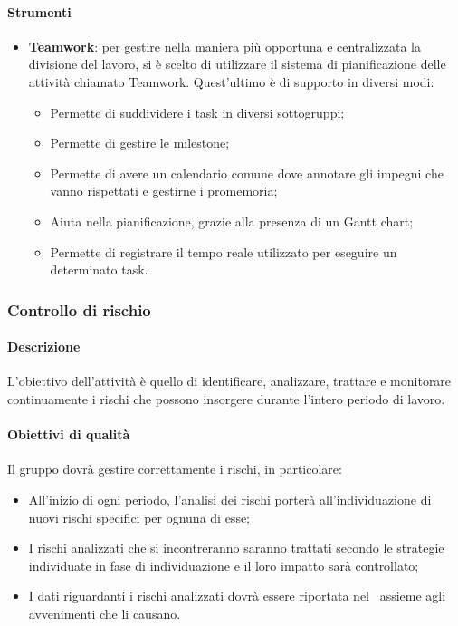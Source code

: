 \documentclass[../NormeDiProgetto_v4.0.0.tex]{subfiles}
\begin{document}
			\paragraph{Strumenti}
			\begin{itemize}
				\item \textbf{Teamwork}: per gestire nella maniera più opportuna e centralizzata la divisione del lavoro, si è scelto di utilizzare il sistema di pianificazione delle attività chiamato Teamwork.
				Quest'ultimo è di supporto in diversi modi:
				\begin{itemize}
				\item Permette di suddividere i task in diversi sottogruppi;
				\item Permette di gestire le milestone;
				\item Permette di avere un calendario comune dove annotare gli impegni che vanno rispettati e gestirne i promemoria;
				\item Aiuta nella pianificazione, grazie alla presenza di un Gantt chart;
				\item Permette di registrare il tempo reale utilizzato per eseguire un determinato task.
				\end{itemize}
			\end{itemize}

		\subsubsection{Controllo di rischio}
			\paragraph{Descrizione}
			L'obiettivo dell'attività è quello di identificare, analizzare, trattare e monitorare continuamente i rischi che possono insorgere durante l'intero periodo di lavoro.
		
			\paragraph{Obiettivi di qualità}
			Il gruppo dovrà gestire correttamente i rischi, in particolare:
			\begin{itemize}
				\item All'inizio di ogni periodo, l'analisi dei rischi porterà all'individuazione di nuovi rischi specifici per ognuna di esse;
				\item I rischi analizzati che si incontreranno saranno trattati secondo le strategie individuate in fase di individuazione e il loro impatto sarà controllato;
				\item I dati riguardanti i rischi analizzati dovrà essere riportata nel \pianodiqualifica\ assieme agli avvenimenti che li causano.
			\end{itemize}
\end{document}
